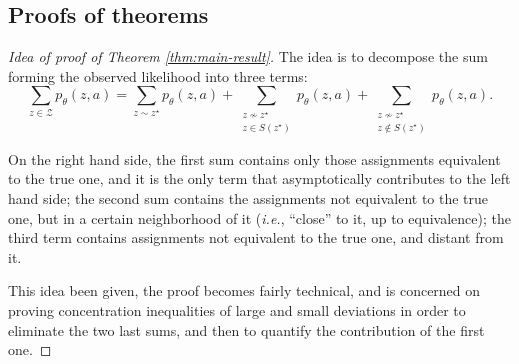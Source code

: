 \documentclass[../../main.tex]{subfiles} %
\begin{document}
\subsection{Proofs of theorems}

\begin{proof}[Idea of proof of Theorem \ref{thm:main-result}]
	The idea is to decompose the sum forming the observed likelihood into three 
	terms:
	\begin{equation}
		\sum_{z \in \mathcal Z} p_{\theta} (z, a) = \sum_{z \sim z^\star} 
		p_{\theta} (z, a) + \sum_{\substack{z \not \sim z^\star \\ z \in 
				S(z^\star)}} p_{\theta} (z, a) + \sum_{\substack{z \not \sim z^\star 
				\\ z 
				\not \in S(z^\star)}} p_{\theta} (z, a).
	\end{equation}
	
	On the right hand side, the first sum contains only those assignments 
	equivalent to the true one, and it is the only term that asymptotically 
	contributes to the left hand side; the second sum contains the assignments 
	not equivalent to the true one, but in a certain neighborhood of it 
	(\textit{i.e.}, ``close'' to it, up to equivalence); the third term contains 
	assignments not equivalent to the true one, and distant from it.
	
	This idea been given, the proof becomes fairly technical, and is concerned on 
	proving concentration inequalities of large and small deviations in order to 
	eliminate the two last sums, and then to quantify the contribution of the first 
	one.
\end{proof}
\end{document}
